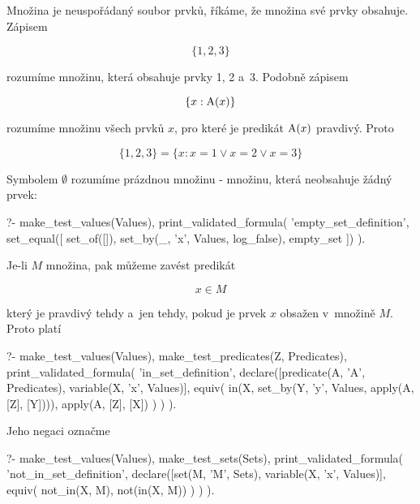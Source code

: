 Množina je neuspořádaný soubor prvků, říkáme, že množina své prvky obsahuje. Zápisem

\begin{equation}
\{1, 2, 3\}
\end{equation}

rozumíme množinu, která obsahuje prvky 1, 2 a~3. Podobně zápisem

\begin{equation}
\{x: \mathrm{A}(x)\}
\end{equation}

rozumíme množinu všech prvků \(x\), pro které je predikát \(\mathrm{A}(x)\) pravdivý. Proto

\begin{equation}
\{1, 2, 3\} = \{x: x = 1 \lor x = 2 \lor x = 3\}
\end{equation}

Symbolem \(\emptyset\) rozumíme prázdnou množinu - množinu, která neobsahuje žádný prvek:

\begin{prolog}
?-	make_test_values(Values),
	print_validated_formula(
		'empty_set_definition',
		set_equal([
			set_of([]),
			set_by(_, 'x', Values, log_false),
			empty_set
		])
	).
\end{prolog}

Je-li \(M\) množina, pak můžeme zavést predikát

\begin{equation}
x \in M
\end{equation}

který je pravdivý tehdy a~jen tehdy, pokud je prvek \(x\) obsažen v~množině \(M\). Proto platí

\begin{prolog}
?-	make_test_values(Values),
	make_test_predicates(Z, Predicates),
	print_validated_formula(
		'in_set_definition',
		declare([predicate(A, 'A', Predicates), variable(X, 'x', Values)],
			equiv(
				in(X, set_by(Y, 'y', Values, apply(A, [Z], [Y]))),
				apply(A, [Z], [X])
			)
		)
	).
\end{prolog}

Jeho negaci označme

\begin{prolog}
?- 	make_test_values(Values),
	make_test_sets(Sets),
	print_validated_formula(
		'not_in_set_definition',
		declare([set(M, 'M', Sets), variable(X, 'x', Values)],
			equiv(
				not_in(X, M),
				not(in(X, M))
			)
		)
	).
\end{prolog}


